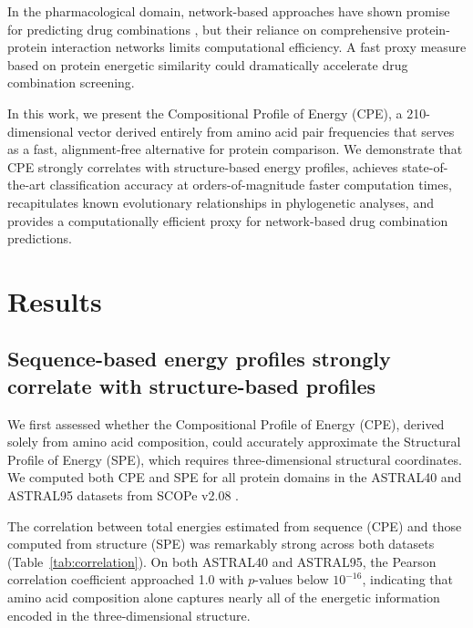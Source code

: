 \documentclass[11pt]{article}
\begin{document}
In the pharmacological domain, network-based approaches have shown promise for predicting drug combinations \citep{cheng2019, barabasi2011}, but their reliance on comprehensive protein-protein interaction networks limits computational efficiency. A fast proxy measure based on protein energetic similarity could dramatically accelerate drug combination screening.

In this work, we present the Compositional Profile of Energy (CPE), a 210-dimensional vector derived entirely from amino acid pair frequencies that serves as a fast, alignment-free alternative for protein comparison. We demonstrate that CPE strongly correlates with structure-based energy profiles, achieves state-of-the-art classification accuracy at orders-of-magnitude faster computation times, recapitulates known evolutionary relationships in phylogenetic analyses, and provides a computationally efficient proxy for network-based drug combination predictions.

\section{Results}

\subsection{Sequence-based energy profiles strongly correlate with structure-based profiles}

We first assessed whether the Compositional Profile of Energy (CPE), derived solely from amino acid composition, could accurately approximate the Structural Profile of Energy (SPE), which requires three-dimensional structural coordinates. We computed both CPE and SPE for all protein domains in the ASTRAL40 and ASTRAL95 datasets from SCOPe v2.08 \citep{fox2014}.

The correlation between total energies estimated from sequence (CPE) and those computed from structure (SPE) was remarkably strong across both datasets (Table~\ref{tab:correlation}). On both ASTRAL40 and ASTRAL95, the Pearson correlation coefficient approached 1.0 with $p$-values below $10^{-16}$, indicating that amino acid composition alone captures nearly all of the energetic information encoded in the three-dimensional structure.
\end{document}
